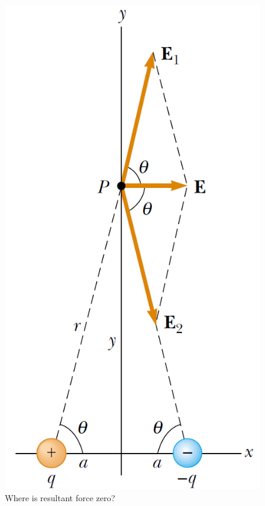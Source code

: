 \documentclass[12pt,a4paper]{article}
\begin{document}
\begin{figure}[H]
\centering
\includegraphics[scale=0.45]{Figure23-15.png}
\caption{Where is resultant force zero?}
\label{electric-field-dipole}
\end{figure}


\end{document}
